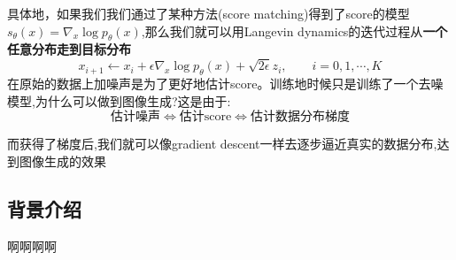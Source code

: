 \documentclass[12pt, a4paper, oneside]{ctexart}
\begin{document}
\par
具体地，如果我们我们通过了某种方法(score matching)得到了score的模型$s_{\theta}(x) = \nabla_x \log p_{\theta}(x)$,那么我们就可以用Langevin dynamics的迭代过程从\textbf{一个任意分布走到目标分布}$$x_{i+1}\leftarrow x_i+\epsilon \nabla_x \log p_{\theta}(x)+\sqrt{2\epsilon}z_i, \qquad i=0,1,\cdots,K$$
在原始的数据上加噪声是为了更好地估计score。训练地时候只是训练了一个去噪模型,为什么可以做到图像生成?这是由于:
$$\mbox{估计噪声}\Leftrightarrow\mbox{估计score}\Leftrightarrow\mbox{估计数据分布梯度}$$
\par
而获得了梯度后,我们就可以像gradient descent一样去逐步逼近真实的数据分布,达到图像生成的效果
\subsection{背景介绍}
啊啊啊啊



\end{document}
